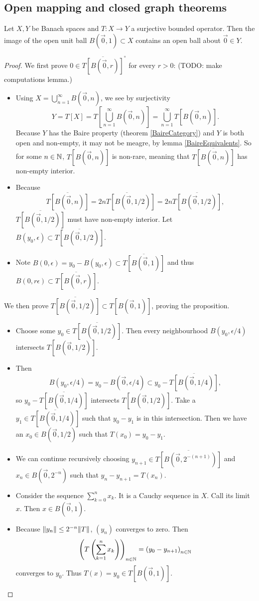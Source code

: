 \subsection{Open mapping and closed graph theorems}

\begin{proposition} \label{openUnitBall}
Let $X,Y$ be Banach spaces and $T:X\to Y$ a surjective bounded operator.  Then the image of the open unit ball $B(\vec{0},1)\subset X$ contains an open ball about $\vec{0}\in Y$.
\end{proposition}
\begin{proof}
We first prove $0\in \overline{T[B(\vec{0},r)]}^\circ$ for every $r>0$: (TODO: make computations lemma.)
\begin{itemize}
\item Using $X = \bigcup_{n=1}^\infty B(\vec{0},n)$, we see by surjectivity
\[ Y = T[X] = T\left[\bigcup_{n=1}^\infty B(\vec{0},n)\right] = \bigcup_{n=1}^\infty T[B(\vec{0},n)]. \]
Because $Y$ has the Baire property (theorem \ref{BaireCategory}) and $Y$ is both open and non-empty, it may not be meagre, by lemma \ref{BaireEquivalents}. So for some $n\in\mathbb{N}$, $T[B(\vec{0},n)]$ is non-rare, meaning that $\overline{T[B(\vec{0},n)]}$ has non-empty interior.
\item Because
\[ \overline{T[B(\vec{0},n)]} = \overline{2nT[B(\vec{0},1/2)]} = 2n\overline{T[B(\vec{0},1/2)]}, \]
$\overline{T[B(\vec{0},1/2)]}$ must have non-empty interior. Let $B(y_0,\epsilon)\subset \overline{T[B(\vec{0},1/2)]}$.
\item Note $B(0,\epsilon) = y_0 - B(y_0,\epsilon) \subset \overline{T[B(\vec{0},1)]}$ and thus $B(0,r\epsilon) \subset \overline{T[B(\vec{0},r)]}$.
\end{itemize}
We then prove $\overline{T[B(\vec{0},1/2)]} \subset T[B(\vec{0}, 1)]$, proving the proposition.
\begin{itemize}
\item Choose some $y_0\in \overline{T[B(\vec{0},1/2)]}$. Then every neighbourhood $B(y_0,\epsilon/4)$ intersects $T[B(\vec{0},1/2)]$.
\item Then
\[ B(y_0,\epsilon/4) = y_0 - B(\vec{0},\epsilon/4) \subset y_0 - \overline{T[B(\vec{0},1/4)]}, \]
so $y_0 - \overline{T[B(\vec{0},1/4)]}$ intersects $T[B(\vec{0},1/2)]$. Take a $y_1 \in \overline{T[B(\vec{0},1/4)]}$ such that $y_0-y_1$ is in this intersection. Then we have an $x_0\in B(\vec{0},1/2)$ such that $T(x_0) = y_0-y_1$.
\item We can continue recursively choosing $y_{n+1}\in \overline{T[B(\vec{0}, 2^{-(n+1)})]}$ and $x_n \in B(\vec{0}, 2^{-n})$ such that $y_n-y_{n+1} = T(x_n)$.
\item Consider the sequence $\sum_{k=0}^nx_k$. It is a Cauchy sequence in $X$. Call its limit $x$. Then $x\in B(\vec{0},1)$.
\item Because $\lVert y_n\rVert\leq 2^{-n}\lVert T\rVert$, $(y_n)$ converges to zero. Then
\[ \left( T\left(\sum^n_{k=1}x_k\right) \right)_{n\in\mathbb{N}} = \left( y_0-y_{n+1} \right)_{n\in\mathbb{N}} \]
converges to $y_0$. Thus $T(x) = y_0 \in T[B(\vec{0},1)]$.
\end{itemize}
\end{proof}

